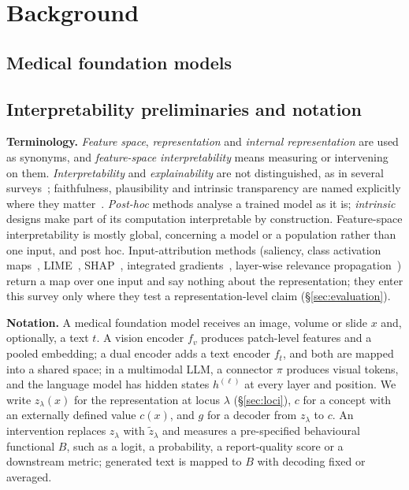 \section{Background}
\label{sec:background}

\subsection{Medical foundation models}
\label{sec:models}



\subsection{Interpretability preliminaries and notation}
\label{sec:prelim}

\textbf{Terminology.} \emph{Feature space}, \emph{representation} and \emph{internal representation}
are used as synonyms, and \emph{feature-space interpretability} means measuring or intervening on them.
\emph{Interpretability} and \emph{explainability} are not distinguished, as in several
surveys~\cite{wan2025survey}; faithfulness, plausibility and intrinsic transparency are named explicitly
where they matter~\cite{lipton2016mythos,rudin2018stop,rudin2021interpretable}. \emph{Post-hoc} methods
analyse a trained model as it is; \emph{intrinsic} designs make part of its computation interpretable by
construction. Feature-space interpretability is mostly global, concerning a model or a population rather
than one input, and post hoc. Input-attribution methods (saliency, class activation
maps~\cite{selvaraju2017gradcam}, LIME~\cite{ribeiro2016why}, SHAP~\cite{lundberg2017unified},
integrated gradients~\cite{sundararajan2017axiomatic}, layer-wise relevance
propagation~\cite{bach2015pixel}) return a map over one input and say nothing about the
representation; they enter this survey only where they test a representation-level claim
(\S\ref{sec:evaluation}).

\textbf{Notation.} A medical foundation model receives an image, volume or slide $x$ and, optionally, a
text $t$. A vision encoder $f_v$ produces patch-level features and a pooled embedding; a dual encoder
adds a text encoder $f_t$, and both are mapped into a shared space; in a multimodal LLM, a connector
$\pi$ produces visual tokens, and the language model has hidden states $h^{(\ell)}$ at every layer and
position. We write $z_\lambda(x)$ for the representation at locus $\lambda$ (\S\ref{sec:loci}), $c$ for
a concept with an externally defined value $c(x)$, and $g$ for a decoder from $z_\lambda$ to $c$. An
intervention replaces $z_\lambda$ with $\tilde z_\lambda$ and measures a pre-specified behavioural
functional $B$, such as a logit, a probability, a report-quality score or a downstream metric; generated
text is mapped to $B$ with decoding fixed or averaged.

